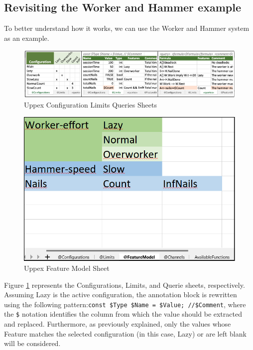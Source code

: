 \subsection*{Revisiting the Worker and Hammer example}

To better understand how it works, we can use the Worker and Hammer system as an example.





\begin{figure} [H]
    \centering
    \includegraphics[width=\linewidth]{chapters/uppex.png}
    \caption{Uppex Configuration Limits Queries Sheets}
    \label{fig:WH_uppex}
\end{figure}

\begin{figure} [H]
    \centering
    \includegraphics[width=0.4\linewidth]{images/upe_WH.png}
    \caption{Uppex Feature Model Sheet}
    \label{fig:WH_FM}
\end{figure}

Figure \ref{fig:WH_uppex} represents the Configurations, Limits, and Querie sheets, respectively. Assuming Lazy is the active configuration, the annotation block is rewritten using the following pattern:\texttt{const \$Type \$Name = \$Value; //\$Comment}, where the \texttt{\$} notation identifies the column from which the value should be extracted and replaced. Furthermore, as previously explained, only the values whose Feature matches the selected configuration (in this case, Lazy) or are left blank will be considered.

